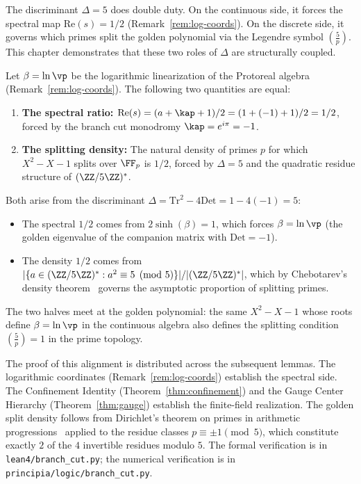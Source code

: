 The discriminant $\Delta = 5$ does double duty. On the continuous side, it forces the spectral map $\mathrm{Re}(s) = 1/2$ (Remark~\ref{rem:log-coords}). On the discrete side, it governs which primes split the golden polynomial via the Legendre symbol $\left(\frac{5}{p}\right)$. This chapter demonstrates that these two roles of $\Delta$ are structurally coupled.

\begin{conjecture}\label{conj:spectral-alignment}
Let $\beta = \ln\vp$ be the logarithmic linearization of the Protoreal algebra (Remark~\ref{rem:log-coords}). The following two quantities are equal:
\begin{enumerate}
\item \textbf{The spectral ratio:} $\mathrm{Re}(s) = (a + \kap + 1)/2 = (1 + (-1) + 1)/2 = 1/2$, forced by the branch cut monodromy $\kap = e^{i\pi} = -1$.
\item \textbf{The splitting density:} The natural density of primes $p$ for which $X^2 - X - 1$ splits over $\FF_p$ is $1/2$, forced by $\Delta = 5$ and the quadratic residue structure of $(\ZZ/5\ZZ)^*$.
\end{enumerate}
Both arise from the discriminant $\Delta = \mathrm{Tr}^2 - 4\mathrm{Det} = 1 - 4(-1) = 5$:
\begin{itemize}
\item The spectral $1/2$ comes from $2\sinh(\beta) = 1$, which forces $\beta = \ln\vp$ (the golden eigenvalue of the companion matrix with $\mathrm{Det} = -1$).
\item The density $1/2$ comes from $|\{a \in (\ZZ/5\ZZ)^* : a^2 \equiv 5 \pmod{5}\}| / |(\ZZ/5\ZZ)^*|$, which by Chebotarev's density theorem~\cite{chebotarev1922} governs the asymptotic proportion of splitting primes.
\end{itemize}
The two halves meet at the golden polynomial: the same $X^2 - X - 1$ whose roots define $\beta = \ln\vp$ in the continuous algebra also defines the splitting condition $\left(\frac{5}{p}\right) = 1$ in the prime topology.
\end{conjecture}

The proof of this alignment is distributed across the subsequent lemmas. The logarithmic coordinates (Remark~\ref{rem:log-coords}) establish the spectral side. The Confinement Identity (Theorem~\ref{thm:confinement}) and the Gauge Center Hierarchy (Theorem~\ref{thm:gauge}) establish the finite-field realization. The golden split density follows from Dirichlet's theorem on primes in arithmetic progressions~\cite{dirichlet1837} applied to the residue classes $p \equiv \pm 1 \pmod{5}$, which constitute exactly $2$ of the $4$ invertible residues modulo $5$. The formal verification is in \texttt{lean4/branch\_cut.py}; the numerical verification is in \texttt{principia/logic/branch\_cut.py}.

